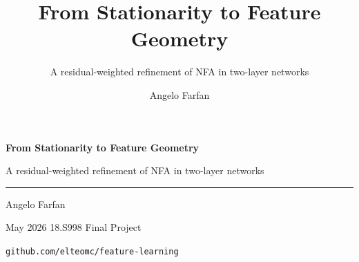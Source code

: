 \documentclass[10pt,aspectratio=169]{beamer}
\title{From Stationarity to Feature Geometry}
\subtitle{A residual-weighted refinement of NFA in two-layer networks}
\author{Angelo Farfan}
\date{}
\begin{document}
\begin{frame}[plain]
  \vspace*{\fill}
  \begin{center}
    {\Huge\bfseries\color{niceblue} From Stationarity to Feature Geometry}\par
    \vspace{0.6em}
    {\large\color{niceblue} A residual-weighted refinement of NFA in two-layer networks}\par
    \vspace{1.0em}
    {\color{niceblue}\rule{0.55\textwidth}{0.6pt}}\par
    \vspace{1.4em}
    {\large Angelo Farfan}\par
    \vspace{0.4em}
    {May 2026 \;\textbar\; 18.S998 Final Project}\par
    \vspace{1.2em}
    {\small\color{nicegray}\texttt{github.com/elteomc/feature-learning}}
  \end{center}
  \vspace*{\fill}
\end{frame}
\end{document}

